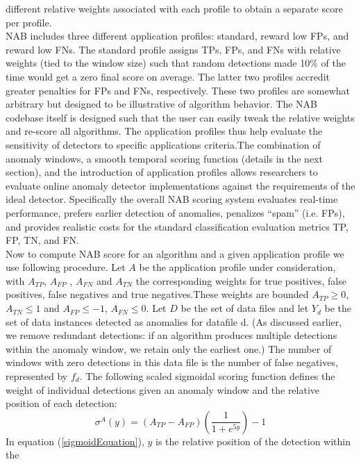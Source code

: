 \documentclass[12pt]{article}
\begin{document}
different relative weights associated with each profile to obtain
a separate score per profile. \\
\break
NAB includes three different application profiles: standard,
reward low FPs, and reward low FNs. The standard profile
assigns TPs, FPs, and FNs with relative weights (tied to the
window size) such that random detections made 10\% of the
time would get a zero final score on average. The latter two
profiles accredit greater penalties for FPs and FNs,
respectively. These two profiles are somewhat arbitrary but
designed to be illustrative of algorithm behavior. The NAB
codebase itself is designed such that the user can easily tweak
the relative weights and re-score all algorithms. The
application profiles thus help evaluate the sensitivity of
detectors to specific applications criteria.The combination of anomaly windows, a smooth temporal
scoring function (details in the next section), and the
introduction of application profiles allows researchers to
evaluate online anomaly detector implementations against the
requirements of the ideal detector. Specifically the overall
NAB scoring system evaluates real-time performance, prefers
earlier detection of anomalies, penalizes “spam” (i.e. FPs), and
provides realistic costs for the standard classification
evaluation metrics TP, FP, TN, and FN.\\
\break
Now to compute NAB score for an algorithm and a given application profile we use following procedure. Let $A$ be the application profile under consideration, with $A_{TP}$, $A_{FP}$	, $A_{FN}$ and $A_{TN}$ the corresponding weights for true positives, false positives, false negatives and true negatives.These weights are bounded $A_{TP} \geq 0$, $A_{TN} \leq 1$ and 
$A_{FP} \leq -1$, $A_{FN} \leq 0$. Let $D$ be the set
of data files and let $Y_d$ be the set of data instances detected as
anomalies for datafile d. (As discussed earlier, we remove
redundant detections: if an algorithm produces multiple
detections within the anomaly window, we retain only the
earliest one.) The number of windows with zero detections in
this data file is the number of false negatives, represented by $f_d$. The following scaled sigmoidal scoring function defines
the weight of individual detections given an anomaly window
and the relative position of each detection:
\begin{equation}
\sigma^{A}(y) = (A_{TP} - A_{FP})(\frac{1}{1+e^{5y}})-1
\label{sigmoidEquation}
\end{equation}
In equation (\ref{sigmoidEquation}), $y$ is the relative position of the detection within the
\end{document}
